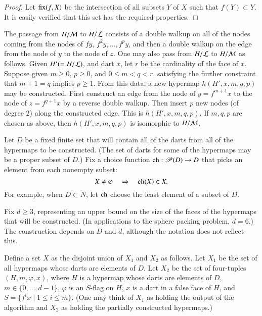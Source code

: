 \begin{proof} Let ${\operatorname{fix}}(f,X)$ be the intersection of all subsets
$Y$ of $X$ such that $f(Y)\subset Y$.  It is easily verified that
this set has the required properties.
\end{proof}


\begin{remark}
The passage from $H/{\cal M}$ to $H/{\cal L}$ consists of a double
walkup on all of the nodes coming from the nodes of $f y$, $f^2 y,
\ldots, f^p y$, and then a double walkup on the edge from the node of
$y$ to the node of
$z$.  %
One may also pass from $H/{\cal L}$ to $H/{\cal M}$ as follows.  Given
$H' (= H/{\cal L})$, and dart $x$, let $r$ be the cardinality of the
face of $x$.  Suppose given $m\ge 0$, $p\ge 0$, and $0 \le m < q < r$,
satisfying the further constraint that $m+1=q$ implies $p\ge1$.  From
this data, a new hypermap $h(H',x,m,q,p)$ may be constructed.  First
construct an edge from the node of $y = f^{m+1} x$ to the node of $z =
f^{q+1} x$ by a reverse double walkup.  Then insert $p$ new nodes (of
degree $2$) along the constructed edge.  This is $h(H',x,m,q,p)$.  If
$m,q,p$ are chosen as above, then $h(H',x,m,q,p)$ is isomorphic to
$H/{\cal M}$.  %
\end{remark}


Let $D$ be a fixed finite set that will contain all of the darts from
all of the hypermaps to be constructed.  (The set of darts for some of
the hypermaps may be a proper subset of $D$.)  Fix a choice function
${\operatorname{ch}}:{\mathscr P}(D)\to D$ that picks an element from each nonempty
subset:
\begin{displaymath}
X\ne\varnothing\quad  \Rightarrow \quad  {\operatorname{ch}}(X)\in X.
\end{displaymath}
 For example, when
$D\subset\ring{N}$, let ${\operatorname{ch}}$ choose the least element of a subset
of $D$.

Fix $d\ge 3$, representing an upper bound on the size of the faces of
the hypermaps that will be constructed.  (In applications to the
sphere packing problem, $d=6$.)  The construction depends on $D$ and
$d$, although the notation does not reflect this.
%

Define a set $X$ as the disjoint union of $X_1$ and $X_2$ as follows.
Let $X_1$ be the set of all hypermaps whose darts are elements of $D$.
Let $X_2$ be the set of four-tuples $(H,m,\varphi,x)$, where $H$ is a
hypermap whose darts are elements of $D$, $m\in\{0,\ldots,d-1\}$,
$\varphi$ is an $S$-flag on $H$, $x$ is a dart in a false face of $H$,
and $S = \{f^i x\mid 1 \le i \le m\}$.  (One may think of $X_1$ as
holding the output of the algorithm and $X_2$ as holding the partially
constructed hypermaps.)

